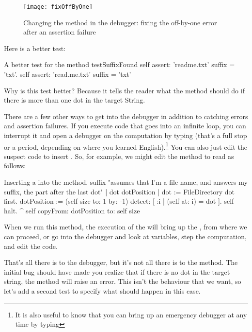 \documentclass[a4paper,10pt,twoside]{book}
\begin{document}
\begin{figure}[btp]
	\begin{center}
		\texttt{[image: fixOffByOne]}
	\end{center}
	\caption{Changing the  method in the debugger: fixing the off-by-one error after an \sunit assertion failure}
\end{figure}

Here is a better test:

\begin{method}[testSuffix2]{A better test for the  method}
testSuffixFound
	self assert: 'readme.txt' suffix = 'txt'.
	self assert: 'read.me.txt' suffix = 'txt'
\end{method}
\noindent
Why is this test better?  Because it tells the reader what the method should do if there is more than one dot in the target String.

There are a few other ways to get into the debugger in addition to catching errors and assertion failures.
If you execute code that goes into an infinite loop, you can interrupt it and open a debugger on the computation by typing  (that's a full stop or a period, depending  on where you learned English).\footnote{It is also useful to know that you can bring up an emergency debugger at any time by typing }
You can also just edit the suspect code to insert .
So, for example, we might edit the  method to read as follows:

\needspace{11ex}
\begin{method}[suffix]{Inserting a  into the  method.}
suffix
	"assumes that I'm a file name, and answers my suffix, the part after the last dot"
	| dot dotPosition |
	dot := FileDirectory dot first.
	dotPosition := (self size to: 1 by: -1) detect: [ :i | (self at: i) = dot ].
	self halt.
	^ self copyFrom: dotPosition to: self size 
\end{method}

When we run this method, the execution of the  will bring up the , from where we can proceed, or go into the debugger and look at variables, step the computation, and edit the code.

That's all there is to the debugger, but it's not all there is to the  method.  
The initial bug should have made you realize that if there is no dot in the target string, the  method will raise an error.  
This isn't the behaviour that we want, so let's add a second test to specify what should happen in this case.
\end{document}
